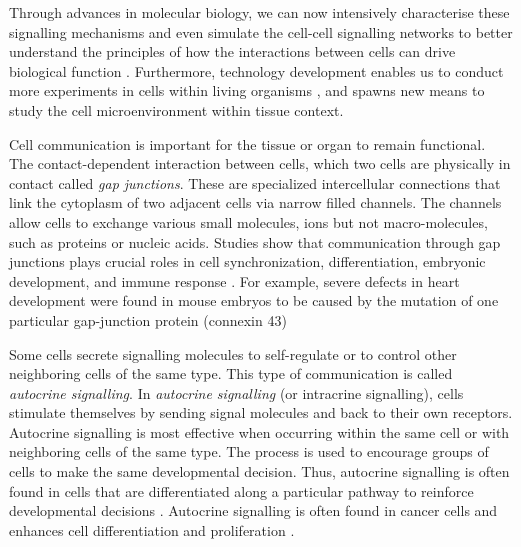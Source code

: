 Through advances in molecular biology, we can now intensively characterise these signalling mechanisms and even simulate the cell-cell signalling networks to better understand the principles of how the interactions between cells can drive biological function \cite{sprinzak2010cis, teague2016synthetic, toda2019engineering}. Furthermore, technology development enables us to conduct more experiments in cells within living organisms \cite{helmchen2005deep, periasamy2013methods}, and spawns new means to study the cell microenvironment within tissue context.

Cell communication is important for the tissue or organ to remain functional. The contact-dependent interaction between cells, which two cells are physically in contact called \textit{gap junctions}. These are specialized intercellular connections that link the cytoplasm of two adjacent cells via narrow filled channels. The channels allow cells to exchange various small molecules, ions but not macro-molecules, such as proteins or nucleic acids. Studies show that communication through gap junctions plays crucial roles in cell synchronization, differentiation, embryonic development, and immune response \cite{white1999genetic, vinken2006connexins}. For example, severe defects in heart development were found in mouse embryos to be caused by the mutation of one particular gap-junction protein (connexin 43)

Some cells secrete signalling molecules to self-regulate or to control other neighboring cells of the same type. This type of communication is called \textit{autocrine signalling}. In \textit{autocrine signalling} (or intracrine signalling), cells stimulate themselves by sending signal molecules and back to their own receptors.  Autocrine signalling is most effective when occurring within the same cell or with neighboring cells of the same type. The process is used to encourage groups of cells to make the same developmental decision. Thus, autocrine signalling is often found in cells that are differentiated along a particular pathway to reinforce developmental decisions \cite{alberts2018molecular}. Autocrine signalling is often found in cancer cells and enhances cell differentiation and proliferation \cite{sporn1985autocrine}.  

